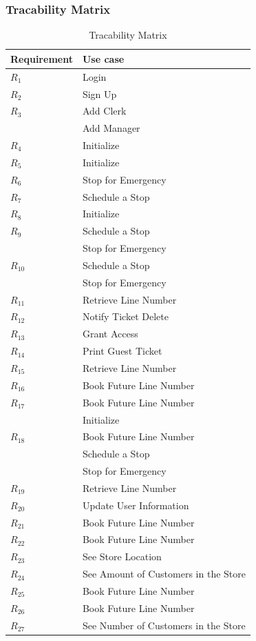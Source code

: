 \subsubsection{Tracability Matrix}
\begin{table}[H]
    \begin{tabular}{|p{8cm}|p{8cm}|}
        \hline
        \textbf{Requirement} & \textbf{Use case} \\ \hline
        $R_{1}$ & Login\\ \hline
        $R_{2}$ & Sign Up\\ \hline
        $R_{3}$ & Add Clerk\\
        & Add Manager \\ \hline
        $R_{4}$ & Initialize \\ \hline
        $R_{5}$ & Initialize \\ \hline
        $R_{6}$ & Stop for Emergency\\ \hline
        $R_{7}$ & Schedule a Stop\\ \hline
        $R_{8}$ & Initialize \\ \hline
        $R_{9}$ & Schedule a Stop\\
        & Stop for Emergency \\ \hline
        $R_{10}$ & Schedule a Stop\\
        & Stop for Emergency\\ \hline
        $R_{11}$ & Retrieve Line Number\\ \hline
        $R_{12}$ & Notify Ticket Delete \\ \hline
        $R_{13}$ & Grant Access \\ \hline
        $R_{14}$ & Print Guest Ticket \\ \hline
        $R_{15}$ & Retrieve Line Number \\ \hline
        $R_{16}$ & Book Future Line Number\\ \hline
        $R_{17}$ & Book Future Line Number\\
        & Initialize \\ \hline
        $R_{18}$ & Book Future Line Number \\
        & Schedule a Stop \\
        & Stop for Emergency\\ \hline
        $R_{19}$ & Retrieve Line Number \\ \hline
        $R_{20}$ & Update User Information\\ \hline
        $R_{21}$ & Book Future Line Number\\ \hline
        $R_{22}$ & Book Future Line Number\\ \hline
        $R_{23}$ & See Store Location\\ \hline
        $R_{24}$ & See Amount of Customers in the Store\\ \hline
        $R_{25}$ & Book Future Line Number\\ \hline
        $R_{26}$ & Book Future Line Number\\ \hline
        $R_{27}$ & See Number of Customers in the Store\\ \hline
    \end{tabular}
    \caption{Tracability Matrix}
\end{table}

